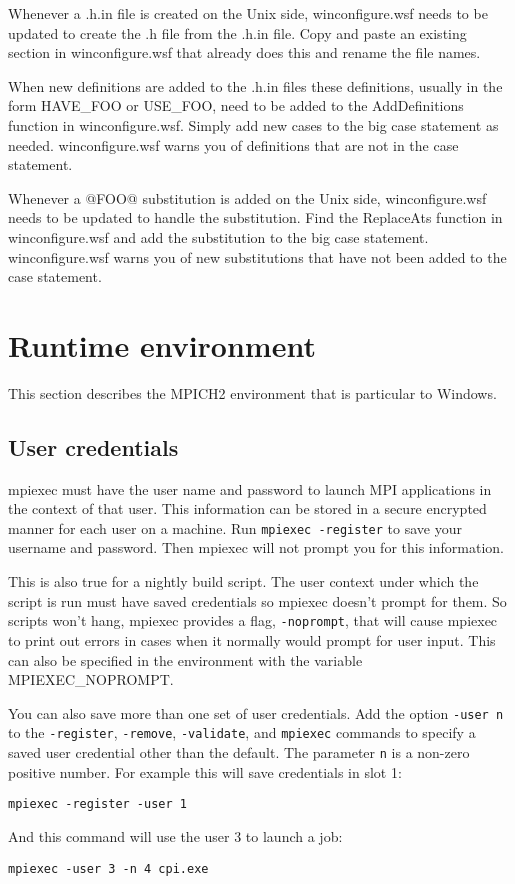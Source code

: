 \documentclass[dvipdfm,11pt]{article}
\begin{document}
Whenever a .h.in file is created on the Unix side, winconfigure.wsf needs to be updated to
create the .h file from the .h.in file.  Copy and paste an existing section in 
winconfigure.wsf that already does this and rename the file names.

When new definitions are added to the .h.in files these definitions, usually in the form HAVE\_FOO 
or USE\_FOO, need to be added to the AddDefinitions function in winconfigure.wsf.  Simply add 
new cases to the big case statement as needed.  winconfigure.wsf warns you of definitions that 
are not in the case statement.

Whenever a @FOO@ substitution is added on the Unix side, winconfigure.wsf needs to be updated
to handle the substitution.  Find the ReplaceAts function in winconfigure.wsf and add the 
substitution to the big case statement.  winconfigure.wsf warns you of new substitutions that
have not been added to the case statement.

\section{Runtime environment}

This section describes the MPICH2 environment that is particular to Windows.

\subsection{User credentials}
mpiexec must have the user name and password to launch MPI applications in the context of
that user.  This information can be stored in a secure encrypted manner for each user on a
machine.  Run \texttt{mpiexec -register} to save your username and password.  Then mpiexec
will not prompt you for this information.

This is also true for a nightly build script.  The user context under which the script is 
run must have saved credentials so mpiexec doesn't prompt for them.  So scripts won't hang,
mpiexec provides a flag, \texttt{-noprompt}, that will cause mpiexec to print out errors in 
cases when it normally would prompt for user input.  This can also be specified in the 
environment with the variable MPIEXEC\_NOPROMPT.

You can also save more than one set of user credentials.  Add the option \texttt{-user n}
to the \texttt{-register}, \texttt{-remove}, \texttt{-validate}, and \texttt{mpiexec}
commands to specify a saved user credential other than the default.  The parameter \texttt{n}
is a non-zero positive number.  For example this will save credentials in slot 1:
\begin{verbatim}
mpiexec -register -user 1
\end{verbatim}
And this command will use the user 3 to launch a job:
\begin{verbatim}
mpiexec -user 3 -n 4 cpi.exe
\end{verbatim}
\end{document}
